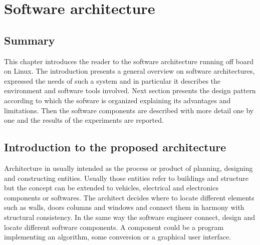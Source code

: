 
\chapter{Software architecture}
\label{chap:sixth
}
\ifpdf
    \graphicspath{{Chapter6/Figures/PNG/}{Chapter6/Figures/PDF/}{Chapter6/Figures/}}
\else
    \graphicspath{{Chapter6/Figures/EPS/}{Chapter6/Figures/}}
\fi

\section*{Summary}

This chapter introduces the reader to the software architecture running off board on Linux. The introduction presents a  general overview on software architectures, expressed the needs of such a system and in particular it describes the environment and software tools involved. Next section presents the design pattern according to which the sofware is organized explaining its advantages and limitations. Then the software components are described with more detail one by one and the results of the experiments are reported.
\section{Introduction to the proposed architecture}

Architecture in usually intended as the process or product of planning, designing and constructing entities. Usually those entities refer to buildings and structure but the concept can be extended to vehicles, electrical and electronics components or softwares. The architect decides where to locate different elements such as walls, doors columns and windows and connect them in harmony with structural consistency. In the same way the software engineer connect, design and locate different software components. A component could be a program implementing an algorithm, some conversion or a graphical user interface.
